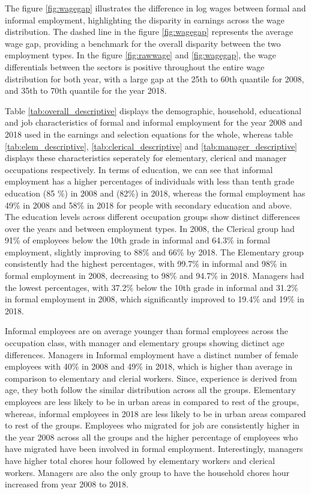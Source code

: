  The figure \ref{fig:wagegap} illustrates the difference in log wages between formal and informal employment, highlighting the disparity in earnings across the wage distribution. The dashed line in the figure \ref{fig:wagegap} represents the average wage gap, providing a benchmark for the overall disparity between the two employment types. In the figure \ref{fig:rawwage} and \ref{fig:wagegap}, the wage differentials between the sectors is positive throughout the entire wage distribution for both year, with a large gap at the 25th to 60th quantile for 2008, and 35th to 70th quantile for the year 2018. 

 Table \ref{tab:overall_descriptive} displays the demographic, household, educational and job characteristics of formal and informal employment for the year 2008 and 2018 used in the earnings and selection equations for the whole, whereas table \ref{tab:elem_descriptive},  \ref{tab:clerical_descriptive} and \ref{tab:manager_descriptive} displays these characteristics seperately for elementary, clerical and manager occupations respectively.  In terms of education, we can see that informal employment has a higher percentages of individuals with less than tenth grade education (85 \%) in 2008 and (82\%) in 2018, whereas the formal employment has 49\% in 2008 and 58\%  in 2018 for people with secondary education and above. The education levels across different occupation groups show distinct differences over the years and between employment types. In 2008, the Clerical group had 91\% of employees below the 10th grade in informal and 64.3\% in formal employment, slightly improving to 88\% and 66\% by 2018. The Elementary group consistently had the highest percentages, with 99.7\% in informal and 98\% in formal employment in 2008, decreasing to 98\% and 94.7\% in 2018. Managers had the lowest percentages, with 37.2\% below the 10th grade in informal and 31.2\% in formal employment in 2008, which significantly improved to 19.4\% and 19\% in 2018. 

Informal employees are on average younger than formal employees across the occupation class, with manager and elementary groups showing dictinct age differences. Managers in Informal employment have a distinct number of female employees with 40\% in 2008 and 49\% in 2018, which is higher than average in comparison to elementary and clerial workers. Since, experience is derived from age, they both follow the similar distribution across all the groups. Elementary employees are less likely to be in urban areas in compared to rest of the groups, whereas, informal employees in 2018 are less likely to be in urban areas compared to rest of the groups. Employees who migrated for job are consistently higher in the year 2008 across all the groups and the higher percentage of employees who have migrated have been involved in formal employment. Interestingly, managers have higher total chores hour followed by elementary workers and clerical workers. Managers are also the only group to  have the household chores hour increased from year 2008 to 2018. 


